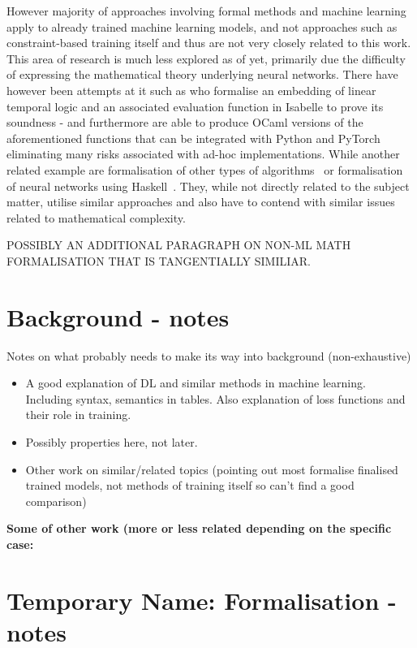 \documentclass[a4paper,10pt]{article}
\begin{document}
However majority of approaches involving formal methods and machine learning  apply to already trained machine learning models, and not approaches such as constraint-based training itself and thus are not very closely related to this work. This area of research is much less explored as of yet, primarily due the difficulty of expressing the mathematical theory underlying neural networks. There have however been attempts at it such as \cite{chevallier2022constrained} who formalise an embedding of linear temporal logic and an associated evaluation function in Isabelle to prove its soundness - and furthermore are able to produce OCaml versions of the aforementioned functions that can be integrated with Python and PyTorch eliminating many risks associated with ad-hoc implementations. 
While another related example are formalisation of other types of algorithms~\cite{daukantas2021trimming} or formalisation of neural networks using Haskell~\cite{xie2023haskell}. They, while not directly related to the subject matter, utilise similar approaches and also have to contend with similar issues related to mathematical complexity.

POSSIBLY AN ADDITIONAL PARAGRAPH ON NON-ML MATH FORMALISATION THAT IS TANGENTIALLY SIMILIAR.



\section{Background - notes}
Notes on what probably needs to make its way into background (non-exhaustive)
\begin{itemize}
	\item A good explanation of DL and similar methods in machine learning. Including syntax, semantics in tables. Also explanation of loss functions and their role in training.
	\item Possibly properties here, not later.
	\item Other work on similar/related topics (pointing out most formalise finalised trained models, not methods of training itself so can't find a good comparison)
\end{itemize}

\textbf{Some of other work (more or less related depending on the specific case:}
 




\section{Temporary Name: Formalisation - notes}
\end{document}
